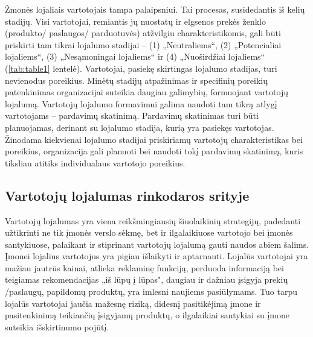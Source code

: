 \documentclass[12pt,titlepage]{article}
\begin{document}
\justify
\hspace{\parindent}
Žmonės lojaliais vartotojais tampa palaipsniui. Tai procesas, susidedantis iš kelių stadijų. Visi vartotojai, remiantis jų nuostatų ir elgsenos prekės ženklo (produkto/ paslaugos/ parduotuvės) atžvilgiu charakteristikomis, gali būti priskirti tam tikrai lojalumo stadijai – (1) „Neutraliems“, (2) „Potencialiai lojaliems“, (3) „Nesąmoningai lojaliems“ ir (4) „Nuoširdžiai lojaliems“ (\ref{tab:table1} lentelė). Vartotojai, pasiekę skirtingas lojalumo stadijas, turi nevienodus poreikius. Minėtų stadijų atpažinimas ir specifinių poreikių patenkinimas organizacijai suteikia daugiau galimybių, formuojant vartotojų lojalumą. Vartotojų lojalumo formavimui galima naudoti tam tikrą atlygį vartotojams – pardavimų skatinimą. Pardavimų skatinimas turi būti planuojamas, derinant su lojalumo stadija, kurią yra pasiekęs vartotojas. Žinodama kiekvienai lojalumo stadijai priskiriamų vartotojų charakteristikas bei poreikius, organizacija gali planuoti bei naudoti tokį pardavimų skatinimą, kuris tiksliau atitiks individualaus vartotojo poreikius. \parencite{pileliene2008pardavimku}
\justify
\subsection{Vartotojų lojalumas rinkodaros srityje}
\justify
\hspace{\parindent}
Vartotojų lojalumas yra viena reikšmingiausių šiuolaikinių strategijų, padedanti užtikrinti ne tik įmonės verslo sėkmę, bet ir ilgalaikiuose vartotojo bei įmonės santykiuose, palaikant ir stiprinant vartotojų lojalumą gauti naudos abiem šalims. Įmonei lojalius vartotojus yra pigiau išlaikyti ir aptarnauti.  Lojalūs vartotojai yra mažiau jautrūs kainai, atlieka reklaminę funkciją, perduoda informaciją bei teigiamas rekomendacijas „iš lūpų į lūpas", daugiau ir dažniau įsigyja prekių /paslaugų, papildomų produktų, yra imlesni naujiems pasiūlymams.  Tuo tarpu lojalūs vartotojai jaučia mažesnę riziką, didesnį pasitikėjimą įmone ir pasitenkinimą teikiančių įsigyjamų produktų, o ilgalaikiai santykiai su įmone suteikia išskirtinumo pojūtį. \\
\end{document}

